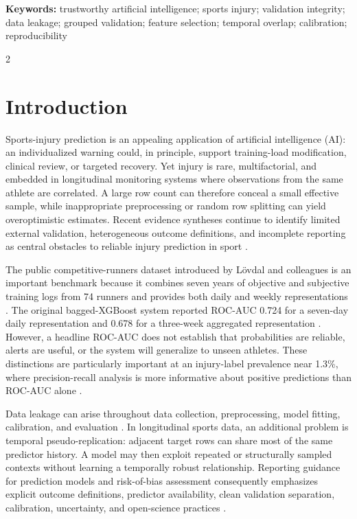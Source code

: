 \documentclass[11pt,a4paper]{article}
\begin{document}
\noindent\textbf{Keywords:} trustworthy artificial intelligence; sports injury; validation integrity; data leakage; grouped validation; feature selection; temporal overlap; calibration; reproducibility

\begin{multicols}{2}

\section{Introduction}

Sports-injury prediction is an appealing application of artificial intelligence (AI): an individualized warning could, in principle, support training-load modification, clinical review, or targeted recovery. Yet injury is rare, multifactorial, and embedded in longitudinal monitoring systems where observations from the same athlete are correlated. A large row count can therefore conceal a small effective sample, while inappropriate preprocessing or random row splitting can yield overoptimistic estimates. Recent evidence syntheses continue to identify limited external validation, heterogeneous outcome definitions, and incomplete reporting as central obstacles to reliable injury prediction in sport \cite{vaneetvelde2021,leckey2025}.

The public competitive-runners dataset introduced by L\"ovdal and colleagues is an important benchmark because it combines seven years of objective and subjective training logs from 74 runners and provides both daily and weekly representations \cite{lovdal2021,lovdaldataverse2021}. The original bagged-XGBoost system reported ROC-AUC 0.724 for a seven-day daily representation and 0.678 for a three-week aggregated representation \cite{lovdal2021}. However, a headline ROC-AUC does not establish that probabilities are reliable, alerts are useful, or the system will generalize to unseen athletes. These distinctions are particularly important at an injury-label prevalence near 1.3\%, where precision-recall analysis is more informative about positive predictions than ROC-AUC alone \cite{saito2015}.

Data leakage can arise throughout data collection, preprocessing, model fitting, calibration, and evaluation \cite{kapoor2023}. In longitudinal sports data, an additional problem is temporal pseudo-replication: adjacent target rows can share most of the same predictor history. A model may then exploit repeated or structurally sampled contexts without learning a temporally robust relationship. Reporting guidance for prediction models and risk-of-bias assessment consequently emphasizes explicit outcome definitions, predictor availability, clean validation separation, calibration, uncertainty, and open-science practices \cite{collins2024,moons2025}.


\end{multicols}
\end{document}
